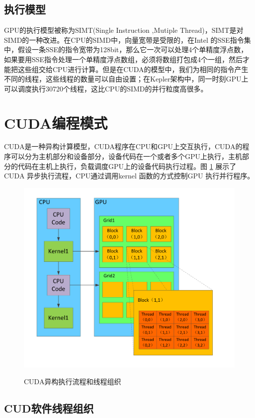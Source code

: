 \subsection{执行模型}
GPU的执行模型被称为SIMT(Single Instruction ,Mutiple Thread)，SIMT是对SIMD的一种改进。在CPU的SIMD中，向量宽带是受限的，在Intel 的SSE指令集中，假设一条SSE的指令宽带为128bit，那么它一次可以处理4个单精度浮点数，如果要用SSE指令处理一个单精度浮点数组，必须将数组打包成4个一组，然后才能把这些组交给CPU进行计算。但是在CUDA的模型中，我们为相同的指令产生不同的线程，这些线程的数量可以自由设置；在Kepler架构中，同一时刻GPU上可以调度执行30720个线程，这比CPU的SIMD的并行粒度高很多。

\section{CUDA编程模式}
CUDA是一种异构计算模型，CUDA程序在CPU和GPU上交互执行，CUDA的程序可以分为主机部分和设备部分，设备代码在一个或者多个GPU上执行，主机部分的代码在主机上执行，负载调度GPU上的设备代码执行过程。图 \ref{ktz} 展示了CUDA 异步执行流程，CPU通过调用kernel 函数的方式控制GPU 执行并行程序。
\begin{figure}
\setlength{\belowcaptionskip}{-0.5cm}
\begin{center}
{\includegraphics[width=1 \textwidth]{figures/block.pdf}}
\end{center}
\caption{{\footnotesize{CUDA异构执行流程和线程组织}}}
\label{ktz}
\end{figure}
\subsection{CUD软件线程组织}

